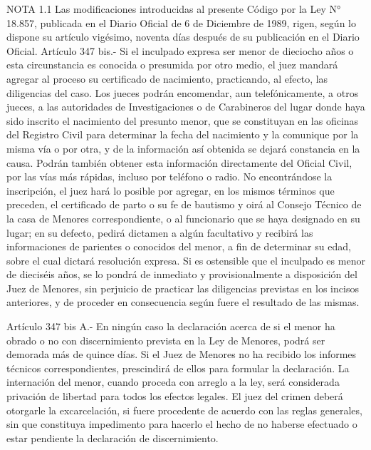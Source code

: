 NOTA 1.1
    Las modificaciones introducidas al presente Código por la Ley N° 18.857, publicada en el Diario Oficial de 6 de Diciembre de 1989, rigen, según lo dispone su artículo vigésimo, noventa días después de su publicación en el Diario Oficial.
    Artículo 347 bis.- Si el inculpado expresa ser menor de dieciocho años o esta circunstancia es conocida o presumida por otro medio, el juez mandará agregar al proceso su certificado de nacimiento, practicando, al efecto, las diligencias del caso.
    Los jueces podrán encomendar, aun telefónicamente, a otros jueces, a las autoridades de Investigaciones o de Carabineros del lugar donde haya sido inscrito el nacimiento del presunto menor, que se constituyan en las oficinas del Registro Civil para determinar la fecha del nacimiento y la comunique por la misma vía o por otra, y de la información así obtenida se dejará constancia en la causa.  Podrán también obtener esta información directamente del Oficial Civil, por las vías más rápidas, incluso por teléfono o radio.
    No encontrándose la inscripción, el juez hará lo posible por agregar, en los mismos términos que preceden, el certificado de parto o su fe de bautismo y oirá al Consejo Técnico de la casa de Menores correspondiente, o al funcionario que se haya designado en su lugar; en su defecto, pedirá dictamen a algún facultativo y recibirá las informaciones de parientes o conocidos del menor, a fin de determinar su edad, sobre el cual dictará resolución expresa.
    Si es ostensible que el inculpado es menor de dieciséis años, se lo pondrá de inmediato y provisionalmente a disposición del Juez de Menores, sin perjuicio de practicar las diligencias previstas en los incisos anteriores, y de proceder en consecuencia según fuere el resultado de las mismas.

    Artículo 347 bis A.- En ningún caso la declaración acerca de si el menor ha obrado o no con discernimiento prevista en la Ley de Menores, podrá ser demorada más de quince días. Si el Juez de Menores no ha recibido los informes técnicos correspondientes, prescindirá de ellos para formular la declaración.
    La internación del menor, cuando proceda con arreglo a la ley, será considerada privación de libertad para todos los efectos legales. El juez del crimen deberá otorgarle la excarcelación, si fuere procedente de acuerdo con las reglas generales, sin que constituya impedimento para hacerlo el hecho de no haberse efectuado o estar pendiente la declaración de discernimiento.

